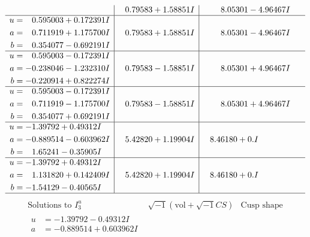 \documentclass[1p]{elsarticle_modified}
\theoremstyle{definition}
\newcommand{\I}{\sqrt{-1}}
\begin{document}
$$\begin{array}{c|c|c}
 & \phantom{-}0.79583 + 1.58851 I & \phantom{-}8.05301 - 4.96467 I \\ \hline\begin{aligned}
u &= \phantom{-}0.595003 + 0.172391 I \\
a &= \phantom{-}0.711919 + 1.175700 I \\
b &= \phantom{-}0.354077 - 0.692191 I\end{aligned}
 & \phantom{-}0.79583 + 1.58851 I & \phantom{-}8.05301 - 4.96467 I \\ \hline\begin{aligned}
u &= \phantom{-}0.595003 - 0.172391 I \\
a &= -0.238046 - 1.232310 I \\
b &= -0.220914 + 0.822274 I\end{aligned}
 & \phantom{-}0.79583 - 1.58851 I & \phantom{-}8.05301 + 4.96467 I \\ \hline\begin{aligned}
u &= \phantom{-}0.595003 - 0.172391 I \\
a &= \phantom{-}0.711919 - 1.175700 I \\
b &= \phantom{-}0.354077 + 0.692191 I\end{aligned}
 & \phantom{-}0.79583 - 1.58851 I & \phantom{-}8.05301 + 4.96467 I \\ \hline\begin{aligned}
u &= -1.39792 + 0.49312 I \\
a &= -0.889514 - 0.603962 I \\
b &= \phantom{-}1.65241 - 0.35905 I\end{aligned}
 & \phantom{-}5.42820 + 1.19904 I & \phantom{-}8.46180 + 0. I\phantom{ +0.000000I} \\ \hline\begin{aligned}
u &= -1.39792 + 0.49312 I \\
a &= \phantom{-}1.131820 + 0.142409 I \\
b &= -1.54129 - 0.40565 I\end{aligned}
 & \phantom{-}5.42820 + 1.19904 I & \phantom{-}8.46180 + 0. I\phantom{ +0.000000I}\\
 \hline 
 \end{array}$$\newpage$$\begin{array}{c|c|c}  
\text{Solutions to }I^u_{3}& \I (\text{vol} + \sqrt{-1}CS) & \text{Cusp shape}\\
 \hline 
\begin{aligned}
u &= -1.39792 - 0.49312 I \\
a &= -0.889514 + 0.603962 I \\

\end{aligned}
\end{array}$$
\end{document}
